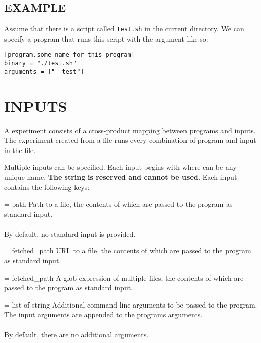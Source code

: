 \documentclass[a4paper,english]{article}
\begin{document}
\begin{adjustwidth}{18pt}{0pt}
        \subsection{EXAMPLE}

            Assume that there is a script called \texttt{test.sh} in the current directory.
            We can specify a program that runs this script with the argument 
            like so:

            \begin{verbatim}
[program.some_name_for_this_program]
binary = "./test.sh"
arguments = ["--test"]
            \end{verbatim}

    \section{INPUTS}

        A  experiment consists of a cross-product mapping between programs
        and inputs.
        The experiment created from a  file runs every combination
        of program and input in the file.

        Multiple inputs can be specified.
        Each input begins with  where  can be any unique name.
        \textbf{The string}  \textbf{is reserved and cannot be used.}
        Each input contains the following keys:

        \begin{Description}[Options]\setlength{\itemsep}{0cm}
            \item[\Opt{file?} = path]
              Path to a file, the contents of which are passed to the program as standard input. \\ \\
              By default, no standard input is provided.
            \item[\Opt{fetch?} = fetched\_path]
              URL to a file, the contents of which are passed to the program as standard input.
            \item[\Opt{glob?} = fetched\_path]
              A glob expression of multiple files, the contents of which are passed to the program
              as standard input.
            \item[\Opt{arguments?} = list of string]
              Additional command-line arguments to be passed to the program.
              The input arguments are appended to the programs arguments. \\ \\
              By default, there are no additional arguments.
        \end{Description}


\end{adjustwidth}
\end{document}
